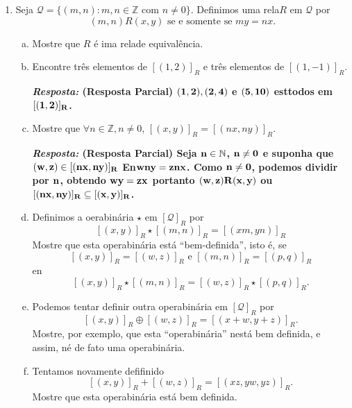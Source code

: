 \begin{enumerate}[{\bf 1.}]
\noindent \textit{\textbf{``contra-exemplo'':}} Sejam $A=\{1,2\}$, $B=\{1,2,3\}$ e $f:A\to B$ dada por $f(1)=1$ e $f(2)=1$. Ent\ao
\[
f^{-1}\bola f=\{(\emptyset,\emptyset),(\{1\},\{1,2\}), (\{1,2\},\{1,2\}), (\{2\},\{1,2\})\},
\]
que \'e sim\'etrica mas n\ao reflexiva.

\item Seja $\mathcal{Q}=\{(m,n): m,n\in \mathbb{Z} \textrm{ com } n\neq 0\}$. Definimos uma rela\cao $R$ em $\mathcal{Q}$ por
\[
(m,n)R(x,y) \textrm { se e somente se } my=nx.
\]
\begin{enumerate}[a)]
\item Mostre que $R$ \'e ima rela\cao de equival\^encia.
\item Encontre tr\^es elementos de $[(1,2)]_R$ e tr\^es elementos de $[(1,-1)]_R$.

{\bf{\it Resposta:} (Resposta Parcial) ${\bf (1,2),(2,4)}$ e ${\bf (5,10)}$ est\ao todos em ${\bf [(1,2)]_R}$.}

\item Mostre que $\forall n\in\mathbb{Z}, n\neq 0$, $[(x,y)]_R=[(nx,ny)]_R$.

{\bf{\it Resposta:} (Resposta Parcial) Seja ${\bf n\in\mathbb{N}}$, ${\bf n\neq 0}$ e suponha que ${\bf (w,z)\in[(nx,ny)]_R}$ En\tao ${\bf wny=znx}$. Como ${\bf n\neq 0}$, podemos dividir por ${\bf n}$, obtendo ${\bf wy=zx}$ portanto ${\bf (w,z)R(x,y)}$ ou ${\bf [(nx,ny)]_R\subseteq[(x,y)]_R}$.}

\item Definimos a oera\cao bin\'aria $\star$ em $[\mathcal{Q}]_R$ por
\[
[(x,y)]_R\star [(m,n)]_R=[(xm,yn)]_R
\]
Mostre que esta opera\cao bin\'aria est\'a ``bem-definida'', isto \'e, se
\[
[(x,y)]_R=[(w,z)]_R \textrm{ e } [(m,n)]_R=[(p,q)]_R
\]
en\tao
\[
[(x,y)]_R\star[(m,n)]_R=[(w,z)]_R\star[(p,q)]_R.
\]
\item Podemos tentar definir outra opera\cao bin\'aria em $[\mathcal{Q}]_R$ por
\[
[(x,y)]_R\oplus[(w,z)]_R=[(x+w,y+z)]_R.
\]
Mostre, por exemplo, que esta ``opera\cao bin\'aria'' n\ao est\'a bem definida, e assim, n\ao \'e de fato uma opera\cao bin\'aria.
\item  Tentamos novamente defifinido
\[
[(x,y)]_R+[(w,z)]_R=[(xz,yw,yz)]_R.
\]
Mostre que esta opera\cao bin\'aria est\'a bem definida.
\end{enumerate}

\indent [Nota: O leitor alerta pode ter feito a identifica\cao de $\mathcal{Q}$ com $\mathbb{Q}$, o conjunto dos n\'umeros racionais, com $m,n$ fazendo o papel de $m/n$. De fato, o que pensamos ser o n\'umero $1/2$ \'e realmente uma classe de esquival\^encia e igauldade de n\'umeros racionais \'e igualdade de classe de equival\^encia. Por isso no ensino b\'asico aprendemos que $1/2=3/6$.]


\end{enumerate}
